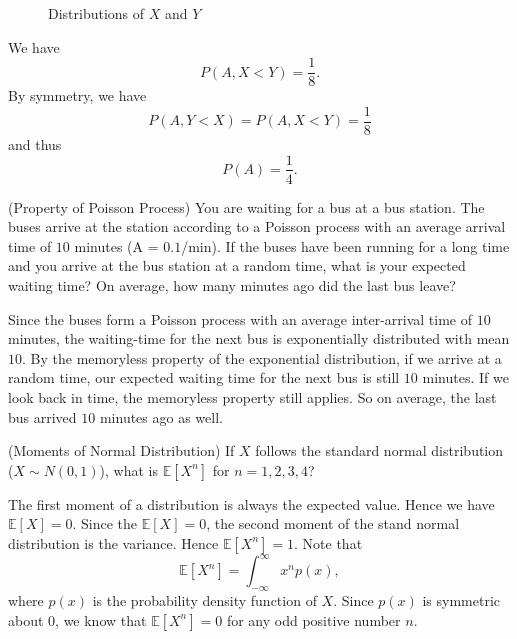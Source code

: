 \documentclass[12pt,letterpaper, onecolumn]{exam}
\begin{document}
\begin{questions}
\begin{solution}
\begin{figure}[H]
                \caption{Distributions of $X$ and $Y$}
            \end{figure}
            We have
            $$P(A,X<Y)=\frac{1}{8}.$$
            By symmetry, we have
            $$P(A,Y<X)=P(A,X<Y)=\frac{1}{8}$$
            and thus 
            $$P(A)=\frac{1}{4}.$$
        \end{solution}
        \question[](Property of Poisson Process) You are waiting for a bus at a bus station. The buses arrive at the station according to a Poisson process with an average arrival time of $10$ minutes (A = $0.1$/min). If the buses
        have been running for a long time and you arrive at the bus station at a random time, what is your expected waiting time? On average, how many minutes ago did the last bus leave?
        \begin{solution}
            Since the buses form a Poisson process with an average inter-arrival time of $10$ minutes, the waiting-time for the next bus is exponentially distributed with mean $10$. By the memoryless property of the exponential distribution, if we arrive at a random time, our expected waiting time for the next bus is still $10$ minutes. If we look back in time, the memoryless property still applies. So on average, the last bus arrived $10$ minutes ago as well.
        \end{solution}
        \question[](Moments of Normal Distribution) If $X$ follows the standard normal distribution ($X\sim N(0,1)$), what is $\mathbb{E}[X^n]$ for $n=1,2,3,4$?
        \begin{solution}
            The first moment of a distribution is always the expected value. Hence we have $\mathbb{E}[X]=0$. Since the $\mathbb{E}[X]=0$, the second moment of the stand normal distribution is the variance. Hence $\mathbb{E}[X^n]=1$. Note that
            $$\mathbb{E}[X^n]=\int_{-\infty}^{\infty}x^np(x),$$
            where $p(x)$ is the probability density function of $X$. Since $p(x)$ is symmetric about $0$, we know that $\mathbb{E}[X^n]=0$ for any odd positive number $n$.
            

\end{solution}
\end{questions}
\end{document}
